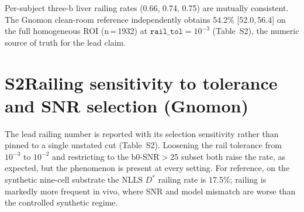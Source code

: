\documentclass[11pt]{article}
\newcommand{\Dstar}{\ensuremath{D^{*}}}
\begin{document}
\begin{table}[htbp]
\centering
\caption{Per-cohort \Dstar{} railing (Sextant; $\texttt{rail\_tol}$ tight bounds; 95\%
bootstrap CI, 5000 resamples). ``Analyzed'' is the bootstrapped voxel count (liver
cohorts subsampled from millions of high-SNR voxels). Pre-registered replication
threshold: point $\ge 0.30$, CI lower $\ge 0.20$. The clean four-b-value liver cohort
(proper $b=0$) is the primary independent cross-organ test (REPLICATES-STRONG); the
sparser three-b-value cohort is supporting evidence only---it omits $b=0$, is normalized
by its lowest acquired $b$, and pools just three subjects---and is reported as REPLICATES
(no wide-bound control).}
\small
{}
\par\vspace{0.3em}
{\footnotesize Per-subject three-b liver railing rates (0.66, 0.74, 0.75) are mutually
consistent. The Gnomon clean-room reference independently obtains 54.2\% [52.0,\,56.4] on
the full homogeneous ROI (n\,=\,1932) at $\texttt{rail\_tol}=10^{-3}$ (Table~S2), the
numeric source of truth for the lead claim.}
\end{table}

\section*{S2\quad Railing sensitivity to tolerance and SNR selection (Gnomon)}

The lead railing number is reported with its selection sensitivity rather than pinned to
a single unstated cut (Table~S2). Loosening the rail tolerance from $10^{-3}$ to
$10^{-2}$ and restricting to the b0-SNR$>$25 subset both raise the rate, as expected, but
the phenomenon is present at every setting. For reference, on the synthetic nine-cell
substrate the NLLS \Dstar{} railing rate is 17.5\%; railing is markedly more frequent in
vivo, where SNR and model mismatch are worse than the controlled synthetic regime.
\end{document}
